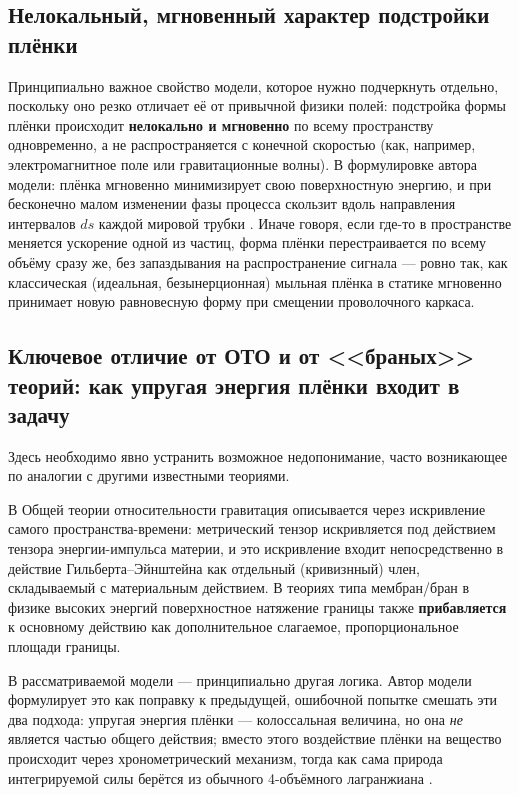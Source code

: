\documentclass[12pt,a4paper]{article}
\begin{document}
\subsection{Нелокальный, мгновенный характер подстройки плёнки}

Принципиально важное свойство модели, которое нужно подчеркнуть
отдельно, поскольку оно резко отличает её от привычной физики полей:
подстройка формы плёнки происходит \textbf{нелокально и мгновенно} по
всему пространству одновременно, а не распространяется с конечной
скоростью (как, например, электромагнитное поле или гравитационные
волны). В формулировке автора модели: плёнка мгновенно минимизирует
свою поверхностную энергию, и при бесконечно малом изменении фазы
процесса скользит вдоль направления интервалов $ds$ каждой мировой
трубки \cite{coax}. Иначе говоря, если где-то в пространстве меняется
ускорение одной из частиц, форма плёнки перестраивается по всему
объёму сразу же, без запаздывания на распространение сигнала ---
ровно так, как классическая (идеальная, безынерционная) мыльная
плёнка в статике мгновенно принимает новую равновесную форму при
смещении проволочного каркаса.

\subsection{Ключевое отличие от ОТО и от <<браных>> теорий: как упругая энергия плёнки входит в задачу}

Здесь необходимо явно устранить возможное недопонимание, часто
возникающее по аналогии с другими известными теориями.

В Общей теории относительности гравитация описывается через
искривление самого пространства-времени: метрический тензор
искривляется под действием тензора энергии-импульса материи, и это
искривление входит непосредственно в действие Гильберта--Эйнштейна
как отдельный (кривизнный) член, складываемый с материальным
действием. В теориях типа мембран/бран в физике высоких энергий
поверхностное натяжение границы также \textbf{прибавляется} к
основному действию как дополнительное слагаемое, пропорциональное
площади границы.

В рассматриваемой модели --- принципиально другая логика. Автор
модели формулирует это как поправку к предыдущей, ошибочной попытке
смешать эти два подхода: упругая энергия плёнки --- колоссальная
величина, но она \emph{не} является частью общего действия; вместо
этого воздействие плёнки на вещество происходит через хронометрический
механизм, тогда как сама природа интегрируемой силы берётся из
обычного 4-объёмного лагранжиана \cite{coax}.
\end{document}

